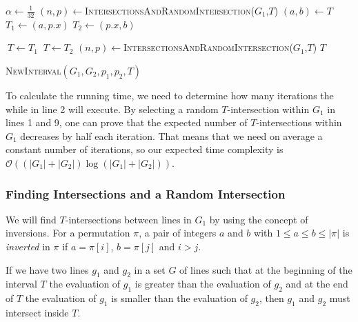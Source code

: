 \documentclass{article}
\def\bigo{\mathcal{O}}
\begin{document}
\begin{algorithm}
\begin{algorithmic}[1]
\State $\alpha \gets \frac{1}{32}$
\State $(n,p) \gets $\textsc{IntersectionsAndRandomIntersection}($G_1$,$T$)
\State $(a,b)\gets T$
\State $T_1 \gets (a,p.x)$
\State $T_2 \gets (p.x, b)$

$\ T\gets T_1$
\Else $\ T\gets T_2$
\EndIf
\State $(n,p) \gets $\textsc{IntersectionsAndRandomIntersection}($G_1$,$T$)
\EndIf
\EndWhile
\State \Return $T$

\end{algorithmic}
\caption{\textsc{NewInterval}$(G_1,G_2,p_1,p_2,T)$}
\label{new_interval_algorithm}
\end{algorithm}

To calculate the running time, we need to determine how many iterations the while in line 2 will execute. By selecting a random $T$-intersection within $G_1$ in lines 1 and 9, one can prove that the expected number of $T$-intersections within $G_1$ decreases by half each iteration. That means that we need on average a constant number of iterations, so our expected time complexity is $\bigo ((|G_1|+|G_2|) \log (|G_1|+|G_2|))$.

\newpage

\subsubsection{Finding Intersections and a Random Intersection}\label{sec:intersections_and_random_intersection}

We will find $T$-intersections between lines in $G_1$ by using the concept of inversions. For a permutation $\pi$, a pair of integers $a$ and $b$ with $1 \leq a \leq b \leq |\pi|$ is \emph{inverted} in $\pi$ if $a = \pi[i]$, $b = \pi[j]$ and $i > j$.

If we have two lines $g_1$ and $g_2$ in a set $G$ of lines such that at the beginning of the interval $T$ the evaluation of $g_1$ is greater than the evaluation of $g_2$ and at the end of $T$ the evaluation of $g_1$ is smaller than the evaluation of $g_2$, then $g_1$ and $g_2$ must intersect inside $T$.
\end{document}
